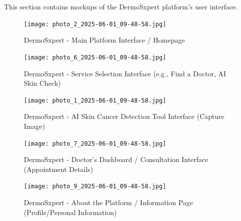 This section contains mockups of the DermoSxpert platform's user interface.

\begin{figure}[H]
    \centering
    \texttt{[image: photo\_2\_2025-06-01\_09-48-58.jpg]}
    \caption{DermoSxpert - Main Platform Interface / Homepage}
    \label{fig:ui_main}
\end{figure}




\begin{figure}[H]
    \centering
    \texttt{[image: photo\_6\_2025-06-01\_09-48-58.jpg]}
    \caption{DermoSxpert - Service Selection Interface (e.g., Find a Doctor, AI Skin Check)}
    \label{fig:ui_service_selection}
\end{figure}

\begin{figure}[H]
    \centering
    \texttt{[image: photo\_1\_2025-06-01\_09-48-58.jpg]}
    \caption{DermoSxpert - AI Skin Cancer Detection Tool Interface (Capture Image)}
    \label{fig:ui_ai_tool}
\end{figure}

\begin{figure}[H]
    \centering
    \texttt{[image: photo\_7\_2025-06-01\_09-48-58.jpg]}
    \caption{DermoSxpert - Doctor's Dashboard / Consultation Interface (Appointment Details)}
    \label{fig:ui_doctor_dashboard}
\end{figure}

\begin{figure}[H]
    \centering
    \texttt{[image: photo\_9\_2025-06-01\_09-48-58.jpg]}
    \caption{DermoSxpert - About the Platform / Information Page (Profile/Personal Information)}
    \label{fig:ui_about}
\end{figure}
